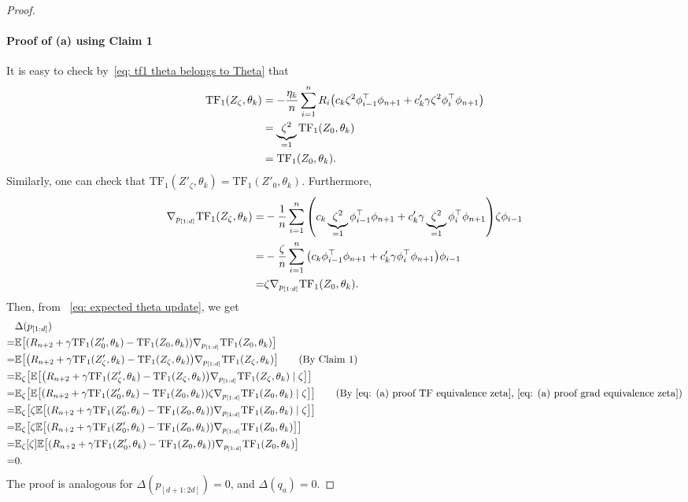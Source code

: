 \documentclass{article}
\newcommand{\explain}[1]{\tag*{(#1)}}
\newcommand{\E}{\mathbb{E}}
\newcommand{\tf}{\text{TF}}
\begin{document}
\begin{proof}
\paragraph{Proof of (a) using Claim 1}
It is easy to check by~\eqref{eq: tf1 theta belongs to Theta} that
\begin{align}
    \tf_1(Z_\zeta,\theta_k)
    &= -\frac{\eta_k}{n}\sum_{i=1}^n  R_i \qty( c_k \zeta^2 \phi_{i-1}^\top \phi_{n+1} + c'_k \gamma \zeta^2 \phi_{i}^\top \phi_{n+1})\\
    &= \underbrace{\zeta^2}_{=1} \tf_1(Z_0,\theta_k)\\
    &= \tf_1(Z_0,\theta_k). \label{eq: (a) proof TF equivalence zeta}
\end{align}
Similarly, one can check that $\tf_1(Z'_\zeta, \theta_k) = \tf_1(Z'_0, \theta_k)$.
Furthermore,
\begin{align}
    \nabla_{p_{[1:d]}} \tf_1(Z_\zeta, \theta_k)
    =& -\frac{1}{n}\sum_{i=1}^n \qty( c_k \underbrace{\zeta^2}_{=1} \phi_{i-1}^\top \phi_{n+1} + c'_k \gamma \underbrace{\zeta^2}_{=1} \phi_{i}^\top \phi_{n+1})\zeta \phi_{i-1} \\
    =& -\frac{\zeta}{n}\sum_{i=1}^n \qty( c_k \phi_{i-1}^\top \phi_{n+1} + c'_k \gamma \phi_{i}^\top \phi_{n+1})\phi_{i-1}\\
    =& \zeta \nabla_{p_{[1:d]}} \tf_1(Z_0, \theta_k).\label{eq: (a) proof grad equivalence zeta}
\end{align}
Then, from ~\eqref{eq: expected theta update}, we get
\begin{align}
    &\Delta (p_{[1:d]}) \\
    =& \E\qty[\qty(R_{n+2} + \gamma\tf_1(Z_0', \theta_k) - \tf_1 (Z_0, \theta_k))\nabla_{p_{[1:d]}}\tf_1(Z_0, \theta_k)] \\
    =& \E\qty[\qty(R_{n+2} + \gamma\tf_1(Z_\zeta', \theta_k) - \tf_1 (Z_\zeta, \theta_k))\nabla_{p_{[1:d]}}\tf_1(Z_\zeta, \theta_k)] \explain{By Claim 1}\\
    =& \E_\zeta\qty[\E\qty[\qty(R_{n+2} + \gamma\tf_1(Z_\zeta', \theta_k) - \tf_1 (Z_\zeta, \theta_k))\nabla_{p_{[1:d]}}\tf_1(Z_\zeta, \theta_k) \mid \zeta ]] \\
    =& \E_\zeta\qty[\E\qty[\qty(R_{n+2} + \gamma\tf_1(Z_0', \theta_k) - \tf_1 (Z_0, \theta_k))\zeta\nabla_{p_{[1:d]}}\tf_1(Z_0, \theta_k) \mid \zeta ]] \explain{By~\eqref{eq: (a) proof TF equivalence zeta},~\eqref{eq: (a) proof grad equivalence zeta}}\\
    =& \E_\zeta\qty[\zeta\E\qty[\qty(R_{n+2} + \gamma\tf_1(Z_0', \theta_k) - \tf_1 (Z_0, \theta_k)) \nabla_{p_{[1:d]}}\tf_1(Z_0, \theta_k) \mid \zeta ]] \\
    =& \E_\zeta\qty[\zeta\E\qty[\qty(R_{n+2} + \gamma\tf_1(Z_0', \theta_k) - \tf_1 (Z_0, \theta_k)) \nabla_{p_{[1:d]}}\tf_1(Z_0, \theta_k)]] \\
    =& \E_\zeta\qty[\zeta]\E\qty[\qty(R_{n+2} + \gamma\tf_1(Z_0', \theta_k) - \tf_1 (Z_0, \theta_k)) \nabla_{p_{[1:d]}}\tf_1(Z_0, \theta_k)] \\
    =& 0.
\end{align}
The proof is analogous for $\Delta(p_{[d+1:2d]}) = 0$, and $\Delta (q_a) = 0$.

\end{proof}
\end{document}
